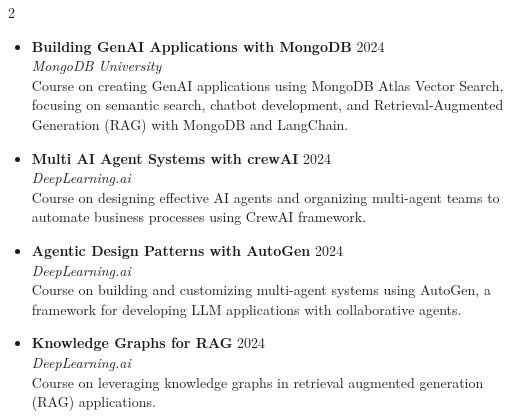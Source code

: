 \begin{cventries}
\begin{multicols}{2}
\raggedright
\footnotesize
\begin{itemize}[leftmargin=*,nosep,label={}]
    \item \textbf{Building GenAI Applications with MongoDB} \hfill {\color{awesome-skyblue} 2024} \\
    \textit{MongoDB University} \\
    Course on creating GenAI applications using MongoDB Atlas Vector Search, focusing on semantic search, chatbot development, and Retrieval-Augmented Generation (RAG) with MongoDB and LangChain.
    \vspace{5pt}


    \item \textbf{Multi AI Agent Systems with crewAI} \hfill {\color{awesome-skyblue} 2024} \\
    \textit{DeepLearning.ai} \\
    Course on designing effective AI agents and organizing multi-agent teams to automate business processes using CrewAI framework.
    \vspace{5pt}
    
    \item \textbf{Agentic Design Patterns with AutoGen} \hfill {\color{awesome-skyblue} 2024} \\
    \textit{DeepLearning.ai} \\
    Course on building and customizing multi-agent systems using AutoGen, a framework for developing LLM applications with collaborative agents.
    \vspace{5pt}
    
    \item \textbf{Knowledge Graphs for RAG} \hfill {\color{awesome-skyblue} 2024} \\
    \textit{DeepLearning.ai} \\
    Course on leveraging knowledge graphs in retrieval augmented generation (RAG) applications.
    \vspace{5pt}


\end{itemize}
\end{multicols}
\end{cventries}
